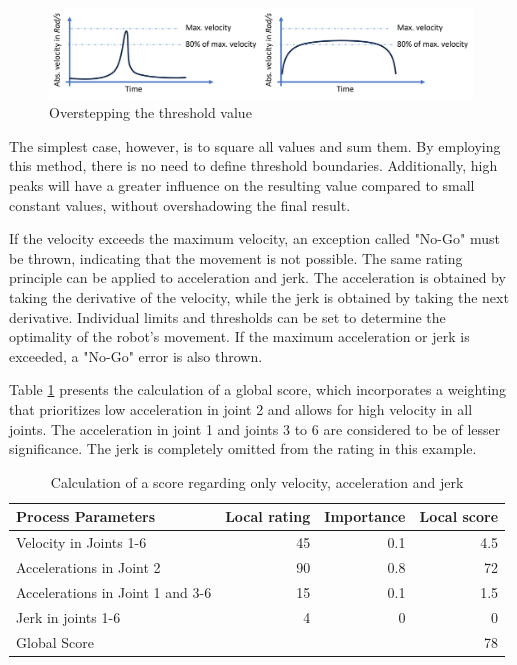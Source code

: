\begin{figure}[H]
	\centerline{\includegraphics[width=1\textwidth]{figures/peaklong.png}}
	\caption{Overstepping the threshold value}
	\label{peaklong}
\end{figure}


The simplest case, however, is to square all values and sum them. By employing this method, there is no need to define threshold boundaries. Additionally, high peaks will have a greater influence on the resulting value compared to small constant values, without overshadowing the final result.

If the velocity exceeds the maximum velocity, an exception called "No-Go" must be thrown, indicating that the movement is not possible. The same rating principle can be applied to acceleration and jerk. The acceleration is obtained by taking the derivative of the velocity, while the jerk is obtained by taking the next derivative. Individual limits and thresholds can be set to determine the optimality of the robot's movement. If the maximum acceleration or jerk is exceeded, a "No-Go" error is also thrown.


Table \ref{VAJ} presents the calculation of a global score, which incorporates a weighting that prioritizes low acceleration in joint 2 and allows for high velocity in all joints. The acceleration in joint 1 and joints 3 to 6 are considered to be of lesser significance. The jerk is completely omitted from the rating in this example.


\begin{table}[H]
	\centering
	\begin{tabular}{||l|r|r|r||}
		Process Parameters & Local rating & Importance & Local score\\
		\hline
		\hline
		\hline
		Velocity in Joints 1-6& 45& 0.1&4.5\\
		Accelerations in Joint 2& 90 & 0.8 & 72\\
		Accelerations in Joint 1 and 3-6 & 15& 0.1&1.5\\
		Jerk in joints 1-6& 4& 0&0\\
		
		\hline
		\hline
		\hline
		Global Score& & &78\\
		\hline
		\hline
	\end{tabular}
	
	\caption{Calculation of a score regarding only velocity, acceleration and jerk}
	\label{VAJ}
\end{table}


